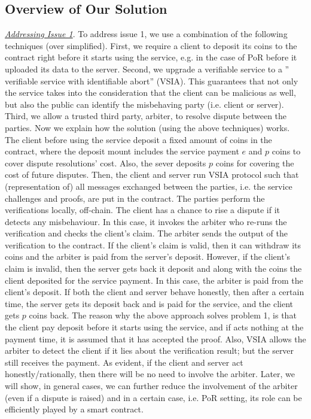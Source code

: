 
\subsection{Overview of Our Solution}

\noindent\underline{\textit{Addressing Issue 1}}. To address issue 1, we use a combination of the following techniques (over simplified). First, we require a client to deposit its coins to the contract right before it starts using the service, e.g. in the case of PoR before it uploaded its data to the server. Second, we upgrade a verifiable service to a '' verifiable service with identifiable abort'' (VSIA). This guarantees that not only the service  takes into the consideration that the client can be malicious as well, but also the public can identify the misbehaving party (i.e. client or server).  Third, we allow a trusted third party, arbiter, to resolve dispute between the parties. Now we explain how the solution (using the above techniques) works. The client before using the service deposit  a fixed amount of coins in the contract, where the deposit mount includes the service payment $e$ and $p$ coins to cover  dispute resolutions' cost. Also, the sever deposits $p$ coins for  covering the cost of future disputes. Then, the client and server  run   VSIA protocol such that (representation of) all messages exchanged between the parties, i.e. the service challenges and  proofs, are put in the contract.  The parties perform the verifications locally, off-chain.   The client  has a chance to rise a dispute if it detects any misbehaviour. In this case, it invokes the arbiter who  re-runs the verification and checks the client's claim. The arbiter sends the output of the verification to the contract. If the client's claim is  valid, then it can withdraw its coins and the arbiter is paid from the server's deposit.  However, if the client's claim is invalid, then the server gets back it deposit and along with the coins the client deposited for the service payment. In this case, the arbiter is paid from the client's deposit. If both the client and server behave honestly, then  after a certain time, the server gets its deposit back and is paid for the service, and  the client gets $p$ coins back.  The reason why the above approach solves problem 1, is that the client pay deposit before it starts using the service, and if acts nothing at the payment time, it is assumed that it has accepted the proof. Also, VSIA allows the arbiter to detect the client  if it lies about the verification result; but the server still receives the payment.  As evident, if the client and server act honestly/rationally, then there will be no need to involve the arbiter.  Later, we will show, in general cases, we can further reduce the involvement of the arbiter (even if a dispute is raised) and in a certain case, i.e. PoR setting, its role can be efficiently played by a smart contract. 

